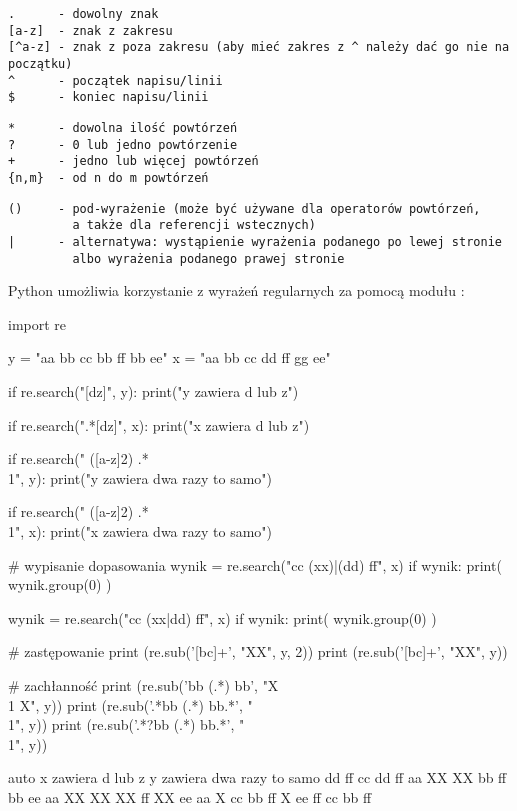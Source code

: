 \vspace{-6pt}\begin{Verbatim}
.      - dowolny znak
[a-z]  - znak z zakresu
[^a-z] - znak z poza zakresu (aby mieć zakres z ^ należy dać go nie na początku)
^      - początek napisu/linii
$      - koniec napisu/linii
\end{Verbatim}
\vspace{-8pt}\begin{Verbatim}
*      - dowolna ilość powtórzeń
?      - 0 lub jedno powtórzenie
+      - jedno lub więcej powtórzeń
{n,m}  - od n do m powtórzeń
\end{Verbatim}
\vspace{-8pt}\begin{Verbatim}
()     - pod-wyrażenie (może być używane dla operatorów powtórzeń,
         a także dla referencji wstecznych)
|      - alternatywa: wystąpienie wyrażenia podanego po lewej stronie
         albo wyrażenia podanego prawej stronie
\end{Verbatim}

\pagebreak[2]\noindent
Python umożliwia korzystanie z wyrażeń regularnych za pomocą modułu :

\begin{CodeFrame}[python]{0.57\textwidth}
import re

y = "aa bb cc bb ff bb ee"
x = "aa bb cc dd ff gg ee"

if re.search("[dz]", y):
  print("y zawiera d lub z")

if re.search(".*[dz]", x):
  print("x zawiera d lub z")

if re.search(" ([a-z]{2}) .* \\1", y):
  print("y zawiera dwa razy to samo")

if re.search(" ([a-z]{2}) .* \\1", x):
  print("x zawiera dwa razy to samo")

# wypisanie dopasowania
wynik = re.search("cc (xx)|(dd) ff", x)
if wynik:
  print( wynik.group(0) )

wynik = re.search("cc (xx|dd) ff", x)
if wynik:
  print( wynik.group(0) )

# zastępowanie
print (re.sub('[bc]+', "XX", y, 2))
print (re.sub('[bc]+', "XX", y))

# zachłanność
print (re.sub('bb (.*) bb', "X \\1 X", y))
print (re.sub('.*bb (.*) bb.*', "\\1", y))
print (re.sub('.*?bb (.*) bb.*', "\\1", y))
\end{CodeFrame}
\begin{CodeFrame}{auto}
x zawiera d lub z
y zawiera dwa razy to samo
dd ff
cc dd ff
aa XX XX bb ff bb ee
aa XX XX XX ff XX ee
aa X cc bb ff X ee
ff
cc bb ff
\end{CodeFrame}

